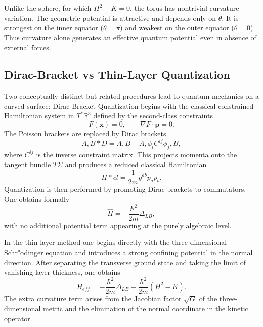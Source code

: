 Unlike the sphere, for which $H^2 - K = 0$, the torus has nontrivial 
curvature variation. The geometric potential is attractive and depends 
only on $\theta$. It is strongest on the inner equator ($\theta=\pi$) 
and weakest on the outer equator ($\theta=0$).
Thus curvature alone generates an effective quantum potential even 
in absence of external forces.

\subsection{Dirac-Bracket vs Thin-Layer Quantization}

Two conceptually distinct but related procedures lead to quantum 
mechanics on a curved surface:
Dirac-Bracket Quantization begins with the classical constrained Hamiltonian 
system in $T^*\mathbb{R}^3$ defined by the second-class constraints
\begin{equation}
F(\mathbf{x}) = 0, \qquad \nabla F \cdot \mathbf{p} = 0.
\end{equation}
The Poisson brackets are replaced by Dirac brackets
\begin{equation}
{A,B}*D = {A,B} - {A,\phi_i}C^{ij}{\phi_j,B},
\end{equation}
where $C^{ij}$ is the inverse constraint matrix. This projects momenta onto 
the tangent bundle $T\Sigma$ and produces a reduced classical Hamiltonian
\begin{equation}
H*{cl} = \frac{1}{2m} g^{ab} p_a p_b.
\end{equation}
Quantization is then performed by promoting Dirac brackets to commutators. 
One obtains formally
\begin{equation}
\hat H = -\frac{\hbar^2}{2m}\Delta_{LB},
\end{equation}
with no additional potential term appearing at the purely algebraic level.

In the thin-layer method one begins directly with the three-dimensional 
Schr"odinger equation and introduces a strong confining potential in the
normal direction. After separating the transverse ground state and taking
the limit of vanishing layer thickness, one obtains
\begin{equation}
H_{eff} = -\frac{\hbar^2}{2m}\Delta_{LB} - \frac{\hbar^2}{2m}(H^2-K).
\end{equation}
The extra curvature term arises from the Jacobian factor $\sqrt{G}$ of the
three-dimensional metric and the elimination of the normal coordinate in 
the kinetic operator.


